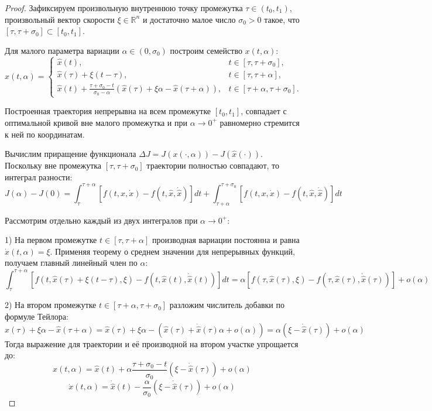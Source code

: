 \begin{proof}
Зафиксируем произвольную внутреннюю точку промежутка $\tau \in (t_0, t_1)$, произвольный вектор скорости
$\xi \in \mathbb{R}^n$ и достаточно малое число $\sigma_0 > 0$ такое, что $[\tau, \tau + \sigma_0] \subset [t_0, t_1]$. 

Для малого параметра вариации $\alpha \in (0, \sigma_0)$ построим семейство 
$x(t, \alpha)$:
\begin{equation}
x(t, \alpha) = 
\begin{cases}
    \hat{x}(t), & t \in [\tau, \tau + \sigma_0], \\
    \hat{x}(\tau) + \xi(t - \tau), & t \in [\tau, \tau + \alpha], \\
    \hat{x}(t) + \frac{\tau + \sigma_0 - t}{\sigma_0 - \alpha} \left( \hat{x}(\tau) + \xi \alpha - \hat{x}(\tau + \alpha) \right), & t \in [\tau + \alpha, \tau + \sigma_0].
\end{cases}
\end{equation}

Построенная траектория непрерывна на всем промежутке $[t_0, t_1]$, совпадает с оптимальной кривой вне малого промежутка и
при $\alpha \to 0^+$ равномерно стремится к ней по координатам.

Вычислим приращение функционала $\Delta J = J(x(\cdot, \alpha)) - J(\hat{x}(\cdot))$.
Поскольку вне промежутка $[\tau, \tau + \sigma_0]$ траектории полностью совпадают, то интеграл разности:
\begin{equation}
    J(\alpha) - J(0) = \int_{\tau}^{\tau+\alpha} \left[ f(t, x, \dot{x}) - f(t, \hat{x}, \dot{\hat{x}}) \right] dt + \int_{\tau+\alpha}^{\tau+\sigma_0} \left[ f(t, x, \dot{x}) - f(t, \hat{x}, \dot{\hat{x}}) \right] dt
\end{equation}

Рассмотрим отдельно каждый из двух интегралов при $\alpha \to 0^+$:

1) На первом промежутке $t \in [\tau, \tau + \alpha]$ производная вариации постоянна и равна $\dot{x}(t, \alpha) = \xi$.
Применяя теорему о среднем значении для непрерывных функций, получаем главный линейный член по $\alpha$:
\begin{equation}
    \int_{\tau}^{\tau+\alpha} \left[ f(t, \hat{x}(\tau) + \xi(t - \tau), \xi) - f(t, \hat{x}(t), \dot{\hat{x}}(t)) \right] dt = \alpha \left[ f(\tau, \hat{x}(\tau), \xi) - f(\tau, \hat{x}(\tau), \dot{\hat{x}}(\tau)) \right] + o(\alpha)
\end{equation}

2) На втором промежутке $t \in [\tau + \alpha, \tau + \sigma_0]$ разложим числитель добавки по формуле Тейлора:
$$ \hat{x}(\tau) + \xi \alpha - \hat{x}(\tau + \alpha) = \hat{x}(\tau) + \xi \alpha - \left( \hat{x}(\tau) + \dot{\hat{x}}(\tau)\alpha + o(\alpha) \right) = \alpha (\xi - \dot{\hat{x}}(\tau)) + o(\alpha) $$
Тогда выражение для траектории и её производной на втором участке упрощается до:
$$ x(t, \alpha) = \hat{x}(t) + \alpha \frac{\tau + \sigma_0 - t}{\sigma_0} (\xi - \dot{\hat{x}}(\tau)) + o(\alpha) $$
$$ \dot{x}(t, \alpha) = \dot{\hat{x}}(t) - \frac{\alpha}{\sigma_0} (\xi - \dot{\hat{x}}(\tau)) + o(\alpha) $$


\end{proof}
